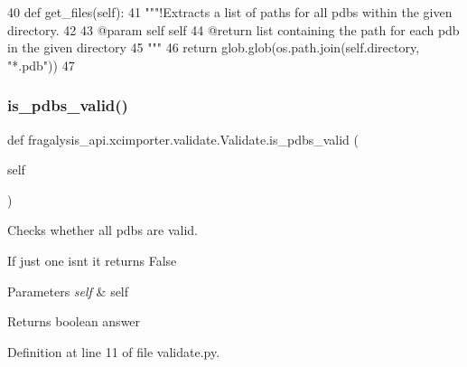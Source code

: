 \begin{DoxyCode}
40     \textcolor{keyword}{def }get\_files(self):
41         \textcolor{stringliteral}{"""!Extracts a list of paths for all pdbs within the given directory.}
42 \textcolor{stringliteral}{        }
43 \textcolor{stringliteral}{        @param self self }
44 \textcolor{stringliteral}{        @return list containing the path for each pdb in the given directory}
45 \textcolor{stringliteral}{        """}
46         \textcolor{keywordflow}{return} glob.glob(os.path.join(self.directory, \textcolor{stringliteral}{"*.pdb"}))
47 
\end{DoxyCode}
\mbox{\label{classfragalysis__api_1_1xcimporter_1_1validate_1_1_validate_a174b180dade39cdd984389ab32ed3732}} 
\subsubsection{\texorpdfstring{is\+\_\+pdbs\+\_\+valid()}{is\_pdbs\_valid()}}
{\footnotesize\ttfamily def fragalysis\+\_\+api.\+xcimporter.\+validate.\+Validate.\+is\+\_\+pdbs\+\_\+valid (\begin{DoxyParamCaption}\item[{}]{self }\end{DoxyParamCaption})}



Checks whether all pdbs are valid. 

If just one isn\textquotesingle{}t it returns False


\begin{DoxyParams}{Parameters}
{\em self} & self \\
\hline
\end{DoxyParams}
\begin{DoxyReturn}{Returns}
boolean answer 
\end{DoxyReturn}


Definition at line 11 of file validate.\+py.


